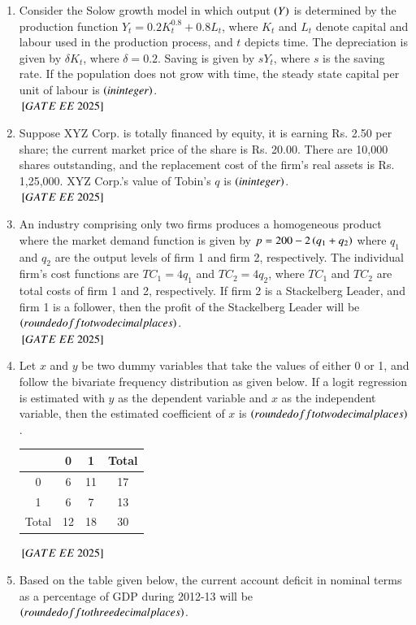 \documentclass[journal,12pt,onecolumn]{IEEEtran}
\theoremstyle{remark}
\begin{document}
\begin{enumerate}
\item Consider the Solow growth model in which output $\left(Y\right)$ is determined by the production function $Y_t = 0.2 K_t^{0.8} + 0.8 L_t$, where $K_t$ and $L_t$ denote capital and labour used in the production process, and $t$ depicts time. The depreciation is given by $\delta K_t$, where $\delta = 0.2$. Saving is given by $sY_t$, where $s$ is the saving rate. If the population does not grow with time, the steady state capital per unit of labour is \underline{\hspace{2cm}} $\left(in integer\right)$.\\
\hfill ${}\left[GATE\ EE\ 2025\right]$
\item Suppose XYZ Corp. is totally financed by equity, it is earning Rs. 2.50 per share; the current market price of the share is Rs. 20.00. There are 10,000 shares outstanding, and the replacement cost of the firm's real assets is Rs. 1,25,000. XYZ Corp.'s value of Tobin's $q$ is \underline{\hspace{2cm}} $\left(in integer\right)$.\\
 \hfill ${}\left[GATE\ EE\ 2025\right]$
\item An industry comprising only two firms produces a homogeneous product where the market demand function is given by $p = 200 - 2\left(q_1 + q_2\right)$ where $q_1$ and $q_2$ are the output levels of firm 1 and firm 2, respectively. The individual firm's cost functions are $TC_1 = 4q_1$ and $TC_2 = 4q_2$, where $TC_1$ and $TC_2$ are total costs of firm 1 and 2, respectively. If firm 2 is a Stackelberg Leader, and firm 1 is a follower, then the profit of the Stackelberg Leader will be \underline{\hspace{2cm}} $\left(rounded off to two decimal places\right)$.\\
 \hfill ${}\left[GATE\ EE\ 2025\right]$
\item Let $x$ and $y$ be two dummy variables that take the values of either 0 or 1, and follow the bivariate frequency distribution as given below. If a logit regression is estimated with $y$ as the dependent variable and $x$ as the independent variable, then the estimated coefficient of $x$ is \underline{\hspace{2cm}} $\left(rounded off to two decimal places\right)$.

\begin{center}
\begin{tabular}{|c|c|c|c|}
\hline
 & 0 & 1 & Total \\
\hline
0 & 6 & 11 & 17 \\
1 & 6 & 7 & 13 \\
\hline
Total & 12 & 18 & 30 \\
\hline
\end{tabular}
\end{center}
 \hfill ${}\left[GATE\ EE\ 2025\right]$
\item Based on the table given below, the current account deficit in nominal terms as a percentage of GDP during 2012-13 will be \underline{\hspace{2cm}} $\left(rounded off to three decimal places\right)$.


\end{enumerate}
\end{document}
